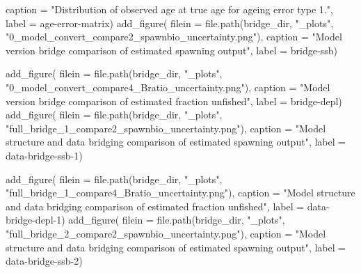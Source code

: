 \documentclass[
  letterpaper,
]{article}
\newenvironment{Shaded}{\begin{snugshade}}{\end{snugshade}}
\newcommand{\AttributeTok}[1]{\textcolor[rgb]{0.77,0.63,0.00}{#1}}
\newcommand{\FunctionTok}[1]{\textcolor[rgb]{0.00,0.00,0.00}{#1}}
\newcommand{\NormalTok}[1]{#1}
\newcommand{\StringTok}[1]{\textcolor[rgb]{0.31,0.60,0.02}{#1}}
\begin{document}
\begin{Shaded}
\begin{Highlighting}[]
\AttributeTok{caption =} \StringTok{"Distribution of observed age at true age for ageing error type 1."}\NormalTok{,}
\AttributeTok{label =} \StringTok{\textquotesingle{}age{-}error{-}matrix\textquotesingle{}}\NormalTok{)}
\FunctionTok{add\_figure}\NormalTok{(}
\AttributeTok{filein =} \FunctionTok{file.path}\NormalTok{(bridge\_dir, }\StringTok{"\_plots"}\NormalTok{, }\StringTok{"0\_model\_convert\_compare2\_spawnbio\_uncertainty.png"}\NormalTok{),}
\AttributeTok{caption =} \StringTok{"Model version bridge comparison of estimated spawning output"}\NormalTok{,}
\AttributeTok{label =} \StringTok{\textquotesingle{}bridge{-}ssb\textquotesingle{}}\NormalTok{)}

\FunctionTok{add\_figure}\NormalTok{(}
\AttributeTok{filein =} \FunctionTok{file.path}\NormalTok{(bridge\_dir, }\StringTok{"\_plots"}\NormalTok{, }\StringTok{"0\_model\_convert\_compare4\_Bratio\_uncertainty.png"}\NormalTok{),}
\AttributeTok{caption =} \StringTok{"Model version bridge comparison of estimated fraction unfished"}\NormalTok{,}
\AttributeTok{label =} \StringTok{\textquotesingle{}bridge{-}depl\textquotesingle{}}\NormalTok{)}
\FunctionTok{add\_figure}\NormalTok{(}
\AttributeTok{filein =} \FunctionTok{file.path}\NormalTok{(bridge\_dir, }\StringTok{"\_plots"}\NormalTok{, }\StringTok{"full\_bridge\_1\_compare2\_spawnbio\_uncertainty.png"}\NormalTok{),}
\AttributeTok{caption =} \StringTok{"Model structure and data bridging comparison of estimated spawning output"}\NormalTok{,}
\AttributeTok{label =} \StringTok{\textquotesingle{}data{-}bridge{-}ssb{-}1\textquotesingle{}}\NormalTok{)}

\FunctionTok{add\_figure}\NormalTok{(}
\AttributeTok{filein =} \FunctionTok{file.path}\NormalTok{(bridge\_dir, }\StringTok{"\_plots"}\NormalTok{, }\StringTok{"full\_bridge\_1\_compare4\_Bratio\_uncertainty.png"}\NormalTok{),}
\AttributeTok{caption =} \StringTok{"Model structure and data bridging comparison of estimated fraction unfished"}\NormalTok{,}
\AttributeTok{label =} \StringTok{\textquotesingle{}data{-}bridge{-}depl{-}1\textquotesingle{}}\NormalTok{)}
\FunctionTok{add\_figure}\NormalTok{(}
\AttributeTok{filein =} \FunctionTok{file.path}\NormalTok{(bridge\_dir, }\StringTok{"\_plots"}\NormalTok{, }\StringTok{"full\_bridge\_2\_compare2\_spawnbio\_uncertainty.png"}\NormalTok{),}
\AttributeTok{caption =} \StringTok{"Model structure and data bridging comparison of estimated spawning output"}\NormalTok{,}
\AttributeTok{label =} \StringTok{\textquotesingle{}data{-}bridge{-}ssb{-}2\textquotesingle{}}\NormalTok{)}


\end{Highlighting}
\end{Shaded}
\end{document}
